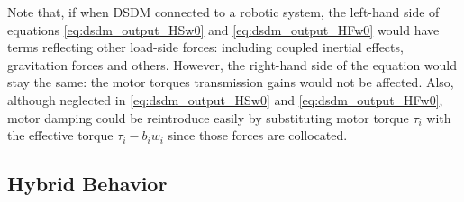 %
Note that, if when DSDM connected to a robotic system, the left-hand side of equations \eqref{eq:dsdm_output_HSw0} and \eqref{eq:dsdm_output_HFw0} would have terms reflecting other load-side forces: including coupled inertial effects, gravitation forces and others. However, the right-hand side of the equation would stay the same: the motor torques transmission gains would not be affected. Also, although neglected in \eqref{eq:dsdm_output_HSw0} and \eqref{eq:dsdm_output_HFw0}, motor damping could be reintroduce easily by substituting motor torque $\tau_i$ with the effective torque $\tau_i - b_i w_i$ since those forces are collocated. 

\newpage
\subsection{Hybrid Behavior}

